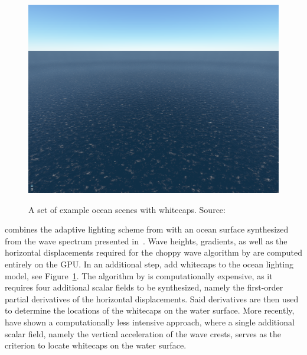 \begin{figure}
{  \includegraphics[scale=0.125]{figures/Real-time_Animation_and_Rendering_of_Ocean_Whitecaps-004.png}
 }
\caption[Ocean whitecaps by \cite{article:whitecaps}.]{
A set of example ocean scenes with whitecaps. Source:~\cite{article:whitecaps}
}
\label{fig:dupuy:whitecaps}
\end{figure}
%
%
\citet{misc:oceanlightingfft} combines the adaptive lighting scheme
from \citet{article:oceanlighting} with an ocean surface synthesized
from the wave spectrum presented in~\citet{article:Elfouhaily1997}.
Wave heights, gradients, as well as the horizontal displacements
required for the choppy wave algorithm by \citet{course:simulatingocean}
are computed entirely on the GPU. 
\textcolor{changed}{In an additional step,
\citet{article:whitecaps} add whitecaps to the ocean lighting model,
see Figure~\ref{fig:dupuy:whitecaps}.
The algorithm by \citeauthor{article:whitecaps} is computationally
expensive, as it requires four additional scalar fields to be
synthesized, namely the first-order partial derivatives of the
horizontal displacements. Said derivatives are then used to determine
the locations of the whitecaps on the water surface.
More recently, \citet{Chen:2017} have shown a computationally
less intensive approach, where a single additional
scalar field, namely the vertical acceleration of the wave crests,
serves as the criterion to locate whitecaps on the water surface.
}

